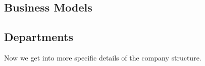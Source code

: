 \documentclass{article}
\begin{document}
    \begin{definition}[Utilities]
      \label{def:utilities}
      
    \end{definition}

    \begin{definition}[Energy]
      \label{def:energy}
      
    \end{definition}

  \subsection{Business Models}

    \begin{definition}[Retailer]
      \label{def:retailer}
      
    \end{definition}

    \begin{definition}[Wholesaler]
      \label{def:wholesaler}
      
    \end{definition}

    \begin{definition}[Subscription]
      \label{def:subscription}
      
    \end{definition}

    \begin{example}[Apple]
      \label{ex:apple}
    
    \end{example}

    \begin{example}[Costco]
      \label{ex:costco}
      
    \end{example}

  \subsection{Departments}

    Now we get into more specific details of the company structure. 

    \begin{definition}
      \label{def:human-resources-hr}
      
    \end{definition}

    \begin{definition}
      \label{def:sales-marketing}
      
    \end{definition}
\end{document}
